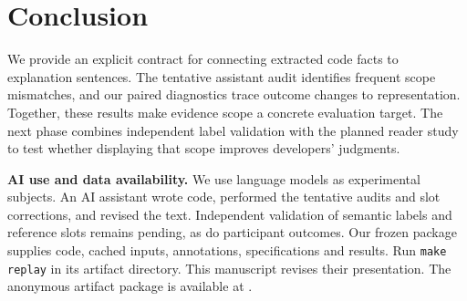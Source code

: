 \section{Conclusion}
We provide an explicit contract for connecting extracted code facts to explanation sentences. The tentative assistant audit identifies frequent scope mismatches, and our paired diagnostics trace outcome changes to representation. Together, these results make evidence scope a concrete evaluation target. The next phase combines independent label validation with the planned reader study to test whether displaying that scope improves developers' judgments.

\smallskip\noindent\textbf{AI use and data availability.} We use language models as experimental subjects. An AI assistant wrote code, performed the tentative audits and slot corrections, and revised the text. Independent validation of semantic labels and reference slots remains pending, as do participant outcomes. Our frozen package supplies code, cached inputs, annotations, specifications and results. Run \texttt{make replay} in its artifact directory. This manuscript revises their presentation. The anonymous artifact package is available at \ArtifactLink.
